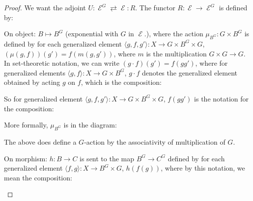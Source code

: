 \documentclass[a4paper]{article}
\DeclareMathOperator{\E}{\mathcal E}
\DeclareMathOperator{\ev}{\text {ev}}
\begin{document}
\begin{proof}
    We want the adjoint $U:\E^G\rightleftarrows \E:R$. 
    The functor $R:\E\to \E^G$ is defined by: 
    
    On object: $B\mapsto B^G$ (exponential with $G$ in $\E$.), where the action $\mu_{B^G}:G\times B^G$ is defined by for each generalized element $\langle g,f,g'\rangle: X\to G\times B^G\times G$, $(\mu (g,f)) (g')=f(m(g,g'))$, where $m$ is the multiplication $G\times G\to G$. In set-theoretic notation, we can write $(g\cdot f)(g')=f(gg')$, where for generalized elements $\langle g,f\rangle:X\to G\times B^G$, $g\cdot f$ denotes the generalized element obtained by acting $g$ on $f$, which is the composition:
    \begin{center} 
    \end{center}

    So for generalized element $\langle g,f,g'\rangle: X\to G\times B^G\times G$, $f(gg')$ is the notation for the composition:
    \begin{center}
    \end{center}
    More formally, $\mu_{B^G}$ is in the diagram:

    \begin{center}
    \end{center}

    The above does define a $G$-action by the associativity of multiplication of $G$.



    On morphism: $h:B\to C$ is sent to the map $B^G\to C^G$ defined by for each generalized element $\langle f,g\rangle :X\to B^G\times G$, $h(f(g))$, where by this notation, we mean the composition: 
    \begin{center}
    \end{center} 


\end{proof}
\end{document}
